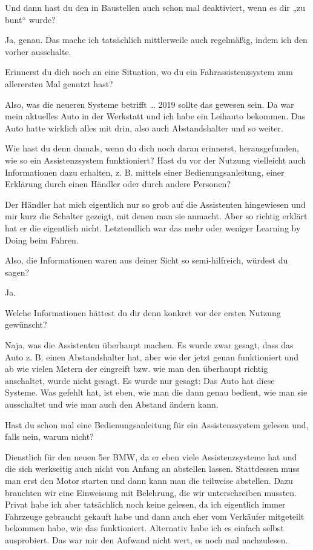 \interviewerin
Und dann hast du den in Baustellen auch schon mal deaktiviert, wenn es
dir „zu bunt“ wurde?

Ja, genau. Das mache ich tatsächlich mittlerweile auch regelmäßig,
indem ich den vorher ausschalte.

\interviewerin
Erinnerst du dich noch an eine Situation, wo du ein
Fahrassistenzsystem zum allerersten Mal genutzt hast?

Also, was die neueren Systeme betrifft … 2019 sollte das gewesen sein.
Da war mein aktuelles Auto in der Werkstatt und ich habe ein Leihauto
bekommen. Das Auto hatte wirklich alles mit drin, also auch
Abstandshalter und so weiter.

\interviewerin
Wie hast du denn damals, wenn du dich noch daran erinnerst,
herausgefunden, wie so ein Assistenzsystem funktioniert? Hast du vor der
Nutzung vielleicht auch Informationen dazu erhalten, z. B. mittels
einer Bedienungsanleitung, einer Erklärung durch einen Händler oder
durch andere Personen?

Der Händler hat mich eigentlich nur so grob auf die Assistenten
hingewiesen und mir kurz die Schalter gezeigt, mit denen man sie anmacht.
Aber so richtig erklärt hat er die eigentlich nicht. Letztendlich war
das mehr oder weniger Learning by Doing beim Fahren.

\interviewerin
Also, die Informationen waren aus deiner Sicht so semi-hilfreich,
würdest du sagen?

Ja.

\interviewerin
Welche Informationen hättest du dir denn konkret vor der ersten Nutzung
gewünscht?

Naja, was die Assistenten überhaupt machen. Es wurde zwar gesagt, dass
das Auto z. B. einen Abstandshalter hat, aber wie der jetzt genau
funktioniert und ab wie vielen Metern der eingreift bzw. wie man den
überhaupt richtig anschaltet, wurde nicht gesagt. Es wurde nur gesagt:
Das Auto hat diese Systeme. Was gefehlt hat, ist eben, wie man die dann
genau bedient, wie man sie ausschaltet und wie man auch den Abstand
ändern kann.

\interviewerin
Hast du schon mal eine Bedienungsanleitung für ein Assistenzsystem
gelesen und, falls nein, warum nicht?

Dienstlich für den neuen 5er BMW, da er eben viele Assistenzsysteme hat
und die sich werkseitig auch nicht von Anfang an abstellen lassen.
Stattdessen muss man erst den Motor starten und dann kann man die
teilweise abstellen. Dazu brauchten wir eine Einweisung mit Belehrung,
die wir unterschreiben mussten. Privat habe ich aber tatsächlich noch
keine gelesen, da ich eigentlich immer Fahrzeuge gebraucht gekauft habe
und dann auch eher vom Verkäufer mitgeteilt bekommen habe, wie das
funktioniert. Alternativ habe ich es einfach selbst ausprobiert. Das war
mir den Aufwand nicht wert, es noch mal nachzulesen.

